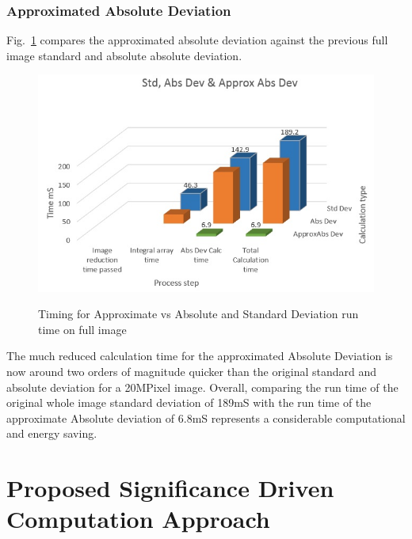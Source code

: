 \documentclass[journal]{IEEEtran}
\begin{document}
\subsubsection*{Approximated Absolute Deviation}
Fig.~\ref{fig:ApproxAbsTime} compares the approximated absolute deviation against the previous full image standard and absolute absolute deviation. 
 \begin{figure}[hp]
 \centering
    \caption{Timing for Approximate vs Absolute and Standard Deviation run time on full image}
    \includegraphics[width=\columnwidth]{AllDeviationTiming.jpg}
   \label{fig:ApproxAbsTime}
\end{figure}
The much reduced calculation time for the approximated Absolute Deviation is now around two orders of magnitude quicker than the original standard and absolute deviation for a 20MPixel image. Overall, comparing the run time of the original whole image standard deviation of 189mS with the run time of the approximate Absolute deviation of 6.8mS represents a considerable computational and energy saving.\\

\section{Proposed Significance Driven Computation Approach}
\end{document}
